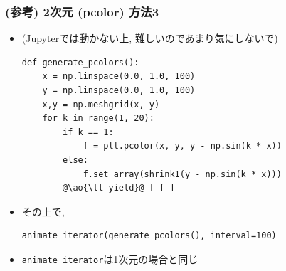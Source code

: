 \documentclass[10pt,dvipdfmx]{beamer}
\newcommand{\ao}[1]{{\color{blue}#1}}
\begin{document}
\begin{frame}[fragile]
  \frametitle{(参考) 2次元 (pcolor) 方法3}
  \begin{itemize}
  \item (Jupyterでは動かない上, 難しいのであまり気にしないで)
\begin{lstlisting}
def generate_pcolors():
    x = np.linspace(0.0, 1.0, 100)
    y = np.linspace(0.0, 1.0, 100)
    x,y = np.meshgrid(x, y)
    for k in range(1, 20):
        if k == 1:
            f = plt.pcolor(x, y, y - np.sin(k * x))
        else:
            f.set_array(shrink1(y - np.sin(k * x)))
        @\ao{\tt yield}@ [ f ]
\end{lstlisting}
\item その上で,
\begin{lstlisting}
animate_iterator(generate_pcolors(), interval=100)    
\end{lstlisting}
\item {\tt animate\_iterator}は1次元の場合と同じ
\end{itemize}
\end{frame}
\end{document}
